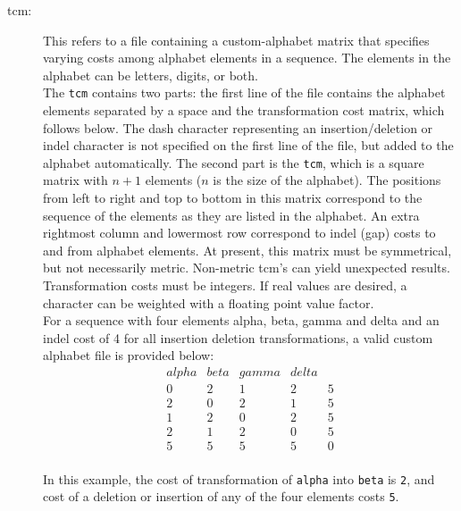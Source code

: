 \begin{description}
		\item [tcm:] This refers to a file containing a custom-alphabet matrix that specifies varying 
		costs among alphabet elements in a sequence. The elements in the alphabet can be letters, 
		digits, or both. \\
		The \texttt{tcm} contains two parts: the first line of the file contains the alphabet elements 
		separated by a space and the transformation cost matrix, which follows below. The dash 
		character representing an insertion/deletion or indel character is not specified on the first 
		line of the file, but added to the alphabet automatically. The second part is the \texttt{tcm}, 
		which is a square matrix with $n + 1$ elements ($n$ is the size of the alphabet). 
		The positions from left to right and top to bottom in this matrix correspond to the sequence 
		of the elements as they are listed in the alphabet. An extra rightmost column and lowermost
		row correspond to indel (gap) costs to and from alphabet elements. At present, this matrix 
		must be symmetrical, but not necessarily metric. Non-metric tcm's can yield unexpected 
		results. Transformation costs must be integers. If real values are desired, a character can 
		be weighted with a floating point value factor. \\
		For a sequence with four elements alpha, beta, gamma and delta and an indel cost of 4 
		for all insertion deletion transformations, a valid custom alphabet file is provided below:
		\\
		\begin{equation*}
		\begin{array}{lllll}
		alpha & beta & gamma & delta &  \\
		0 &   2 &  1 &   2 &   5 \\
		2 &   0 &  2 &   1 &   5 \\
		1 &   2 &  0 &   2 &   5 \\
		2 &   1 &  2 &   0 &   5 \\
		5 &   5 &  5 &   5 &   0
		\end{array}
		\end{equation*} 
		\\
		In this example, the cost of transformation of \texttt{alpha} into \texttt{beta} is \texttt{2},
		and cost of a deletion or insertion of any of the four elements costs \texttt{5}.


\end{description}
